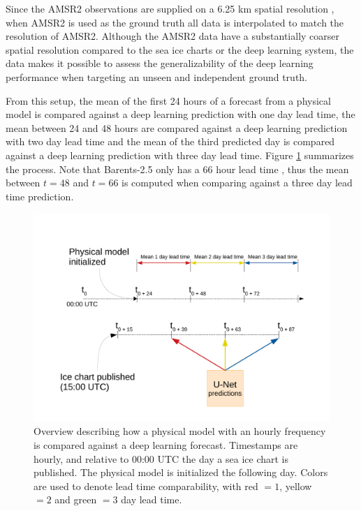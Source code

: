 \documentclass[../main/thesis.tex]{subfiles}
\begin{document}
Since the AMSR2 observations are supplied on a 6.25 km spatial resolution \citep{Spreen2008}, when AMSR2 is used as the ground truth all data is interpolated to match the resolution of AMSR2. Although the AMSR2 data have a substantially coarser spatial resolution compared to the sea ice charts or the deep learning system, the data makes it possible to assess the generalizability of the deep learning performance when targeting an unseen and independent ground truth.

From this setup, the mean of the first 24 hours of a forecast from a physical model is compared against a deep learning prediction with one day lead time, the mean between 24 and 48 hours are compared against a deep learning prediction with two day lead time and the mean of the third predicted day is compared against a deep learning prediction with three day lead time. Figure \ref{fig:product_compare_timeline} summarizes the process. Note that Barents-2.5 only has a 66 hour lead time \citep{Roehrs2022}, thus the mean between $t = 48$ and $t = 66$ is computed when comparing against a three day lead time prediction.

\begin{figure}
    \centering
    \includegraphics[width=\textwidth]{product_compare_timeline}
    \caption{\label{fig:product_compare_timeline}Overview describing how a physical model with an hourly frequency is compared against a deep learning forecast. Timestamps are hourly, and relative to 00:00 UTC the day a sea ice chart is published. The physical model is initialized the following day. Colors are used to denote lead time comparability, with red $= 1$, yellow $= 2$ and green $= 3$ day lead time.}
\end{figure}
\end{document}
